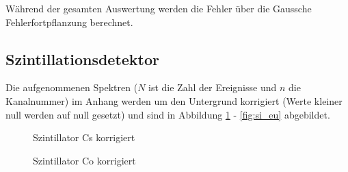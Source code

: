 Während der gesamten Auswertung werden die Fehler über die Gaussche Fehlerfortpflanzung berechnet.

\subsection{Szintillationsdetektor}
Die aufgenommenen Spektren ($N$ ist die Zahl der Ereignisse und $n$ die Kanalnummer) im Anhang werden um den Untergrund korrigiert (Werte kleiner null werden auf null gesetzt) und sind in Abbildung \ref{fig:si_cs} - \ref{fig:si_eu} abgebildet. 

\begin{figure}[h]
\centering
{}
\caption{Szintillator Cs korrigiert}
\label{fig:si_cs}
\end{figure}

\newpage

\begin{figure}[h]
\centering
{}
\caption{Szintillator Co korrigiert}
\label{fig:si_co}
\end{figure}

